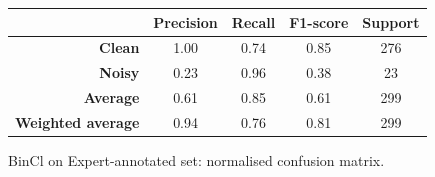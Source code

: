 \documentclass[a4paper,10pt]{article}
\begin{document}
\begin{figure}[p]
{\begin{minipage}{0.6\textwidth}
			\caption{BinCl on Expert-annotated set: normalised confusion matrix.}%
			\label{fig:bincl_segm_cm}
		\end{minipage}
	}
	\baselineskip
	\centering
	\begin{tabular}{r|c|c|c|c}
		                          & \textbf{Precision} & \textbf{Recall} & \textbf{F1-score} & \textbf{Support} \\ \midrule
		\textbf{Clean}            & 1.00               & 0.74            & 0.85              & 276              \\
		\textbf{Noisy}            & 0.23               & 0.96            & 0.38              & 23               \\ \midrule
		\textbf{Average}          & 0.61               & 0.85            & 0.61              & 299              \\
		\textbf{Weighted average} & 0.94               & 0.76            & 0.81              & 299
	\end{tabular}
	\label{tab:bincl_segm_cr}
\end{figure}
\end{document}
